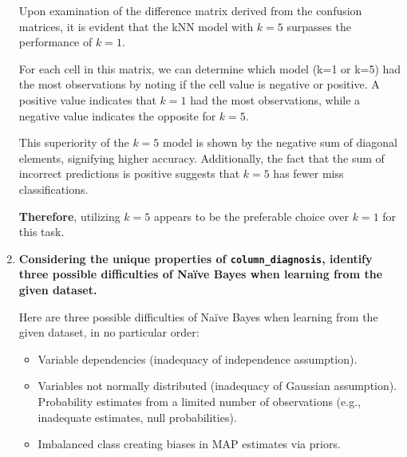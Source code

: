\documentclass[12pt]{article}
\begin{document}
\begin{enumerate}[leftmargin=\labelsep]
          Upon examination of the difference matrix derived from the confusion matrices, it is evident that the kNN model 
          with \(k=5\) surpasses the performance of \(k=1\).

          For each cell in this matrix, we can determine which model (k=1 or k=5) had the most observations by noting if 
          the cell value is negative or positive. A positive value indicates that \(k=1\) had the most observations, while 
          a negative value indicates the opposite for \(k=5\).

          This superiority of the \(k=5\) model is shown by the negative sum of diagonal elements, signifying higher accuracy. 
          Additionally, the fact that the sum of incorrect predictions is positive suggests that \(k=5\) has fewer miss classifications.

          \textbf{Therefore}, utilizing \(k=5\) appears to be the preferable choice over \(k=1\) for this task.


    \item \textbf{Considering the unique properties of \texttt{column\_diagnosis}, identify three possible difficulties
          of Naïve Bayes when learning from the given dataset.}

          \vskip 0.3cm
          Here are three possible difficulties of Naïve Bayes when learning from the given dataset,
          in no particular order:

          \begin{itemize} %
              \item Variable dependencies (inadequacy of independence assumption).
              \item Variables not normally distributed (inadequacy of Gaussian assumption). Probability estimates from a limited number of observations (e.g., inadequate estimates, null probabilities).
              \item Imbalanced class creating biases in MAP estimates via priors.
          \end{itemize}
\end{enumerate}
\end{document}
